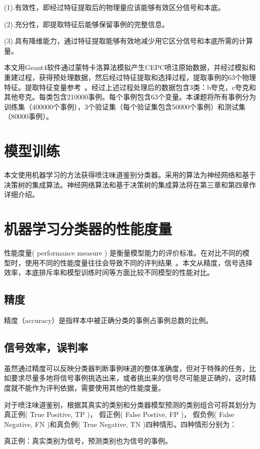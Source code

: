 (1).有效性，即经过特征提取后的物理量应该能够有效区分信号和本底。

(2).充分性，即提取特征后能够保留事例的完整信息。

(3).具有降维能力，通过特征提取能够有效地减少用它区分信号和本底所需的计算量。

本文用Geant4软件通过蒙特卡洛算法模拟产生CEPC喷注原始数据，并经过模拟和重建过程，获得预处理数据，然后经过特征提取和选择过程，提取事例的63个物理特征。提取特征变量参考~\cite{lcfi}。经过上述过程处理后的数据包含3类：b夸克，c夸克和其他夸克。每类包含210000事例。每个事例包含63个变量。本课题将所有事例分为训练集（400000个事例），3个验证集（每个验证集包含50000个事例）和测试集（80000事例）。

\section{模型训练}
本文使用机器学习的方法获得喷注味道鉴别分类器。采用的算法为神经网络和基于决策树的集成算法。神经网络算法和基于决策树的集成算法将在第三章和第四章作详细介绍。

\section{机器学习分类器的性能度量}
性能度量( performance measure ) 是衡量模型能力的评价标准。在对比不同的模型时，使用不同的性能度量往往会导致不同的评判结果~\cite{zhouzhihua}。本文从精度，信号选择效率，本底排斥率和模型训练时间等方面比较不同模型的性能对比。\\
\subsection{精度}
精度（accuracy）是指样本中被正确分类的事例占事例总数的比例。\\

\subsection{信号效率，误判率}
虽然通过精度可以反映分类器判断事例味道的整体准确度，但对于特殊的任务，比如要求尽量多地将信号事例挑选出来，或者挑出来的信号尽可能是正确的，这时精度就不能作为评判依据，需要使用其他的性能度量。

对于喷注味道鉴别，根据其真实的类别和分类器模型预测的类别组合可将其划分为真正例( True Positive, TP )， 假正例( False Postive, FP )， 假负例( False Negative, FN )和真负例( True Negative, TN )四种情形。四种情形分别为：

真正例：真实类别为信号，预测类别也为信号的事例。

